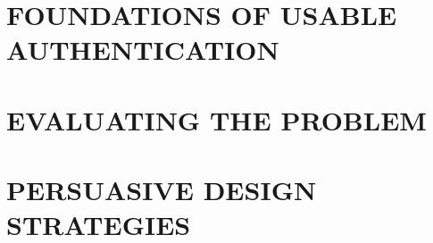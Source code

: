 \documentclass[12pt,a4paper]{book}
\begin{document}
	
\frontmatter
\maketitle
\tableofcontents
\mainmatter





\part{FOUNDATIONS OF USABLE AUTHENTICATION}
\label{part:related_work}

%
%









%

%


\part{EVALUATING THE PROBLEM}
\label{part:problem_space}
%
%


\part{PERSUASIVE DESIGN STRATEGIES}
\label{part:design_space}



\end{document}
